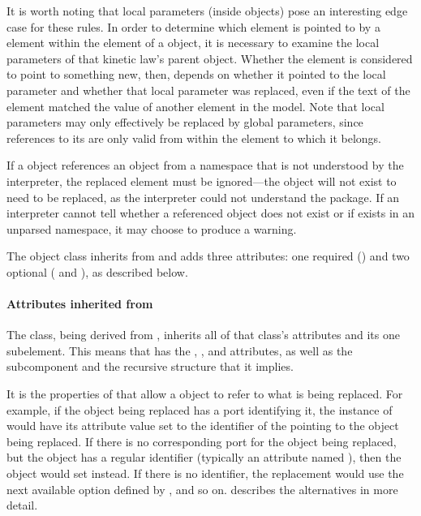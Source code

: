 It is worth noting that local parameters (inside \Reaction objects) pose an interesting edge case for these rules. In order to determine which element is pointed to by a  element within the  element of a \KineticLaw object, it is necessary to examine the local parameters of that kinetic law's parent \Reaction object.  Whether the  element is considered to point to something new, then, depends on whether it pointed to the local parameter and whether that local parameter was replaced, even if the text of the element matched the  value of another element in the model.  Note that local parameters may only effectively be replaced by global parameters, since references to its  are only valid from within the \Reaction element to which it belongs.

If a \ReplacedElement object references an object from a namespace that is not understood by the interpreter, the replaced element must be ignored---the object will not exist to need to be replaced, as the interpreter could not understand the package.  If an interpreter cannot tell whether a referenced object does not exist or if exists in an unparsed namespace, it may choose to produce a warning.

The \ReplacedElement object class inherits from \SBaseRef and adds three attributes: one required () and two optional ( and ), as described below.


\paragraph{Attributes inherited from }

The \ReplacedElement class, being derived from \SBaseRef, inherits all of that class's attributes and its one subelement.  This means that \ReplacedElement has the , ,  and  attributes, as well as the subcomponent  and the recursive structure that it implies.

It is the properties of \SBaseRef that allow a \ReplacedElement object to refer to what is being replaced.  For example, if the object being replaced has a port identifying it, the instance of \ReplacedElement would have its  attribute value set to the identifier of the \Port pointing to the object being replaced.  If there is no corresponding port for the object being replaced, but the object has a regular identifier (typically an attribute named ), then the \ReplacedElement object would set  instead.  If there is no identifier, the replacement would use the next available option defined by \SBaseRef, and so on.   describes the alternatives in more detail.


